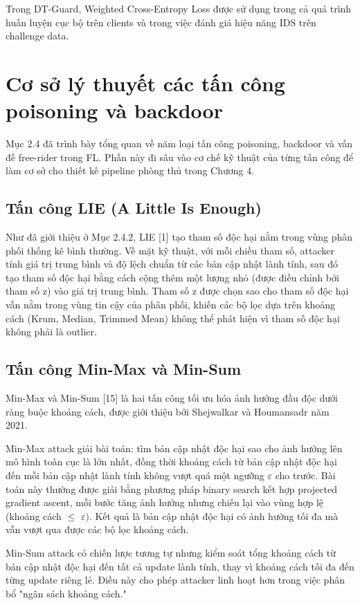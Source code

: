 Trong DT-Guard, Weighted Cross-Entropy Loss được sử dụng trong cả quá trình huấn luyện cục bộ trên clients và trong việc đánh giá hiệu năng IDS trên challenge data.

\section{Cơ sở lý thuyết các tấn công poisoning và backdoor}
Mục 2.4 đã trình bày tổng quan về năm loại tấn công poisoning, backdoor và vấn đề free-rider trong FL. Phần này đi sâu vào cơ chế kỹ thuật của từng tấn công để làm cơ sở cho thiết kế pipeline phòng thủ trong Chương 4.

\subsection{Tấn công LIE (A Little Is Enough)}
Như đã giới thiệu ở Mục 2.4.2, LIE {[}1{]} tạo tham số độc hại nằm trong vùng phân phối thống kê bình thường. Về mặt kỹ thuật, với mỗi chiều tham số, attacker tính giá trị trung bình và độ lệch chuẩn từ các bản cập nhật lành tính, sau đó tạo tham số độc hại bằng cách cộng thêm một lượng nhỏ (được điều chỉnh bởi tham số z) vào giá trị trung bình. Tham số z được chọn sao cho tham số độc hại vẫn nằm trong vùng tin cậy của phân phối, khiến các bộ lọc dựa trên khoảng cách (Krum, Median, Trimmed Mean) không thể phát hiện vì tham số độc hại không phải là outlier.

\subsection{Tấn công Min-Max và Min-Sum}
Min-Max và Min-Sum {[}15{]} là hai tấn công tối ưu hóa ảnh hưởng đầu độc dưới ràng buộc khoảng cách, được giới thiệu bởi Shejwalkar và Houmansadr năm 2021.

Min-Max attack giải bài toán: tìm bản cập nhật độc hại sao cho ảnh hưởng lên mô hình toàn cục là lớn nhất, đồng thời khoảng cách từ bản cập nhật độc hại đến mỗi bản cập nhật lành tính không vượt quá một ngưỡng $\varepsilon$ cho trước. Bài toán này thường được giải bằng phương pháp binary search kết hợp projected gradient ascent, mỗi bước tăng ảnh hưởng nhưng chiếu lại vào vùng hợp lệ (khoảng cách $\leq$ $\varepsilon)$. Kết quả là bản cập nhật độc hại có ảnh hưởng tối đa mà vẫn vượt qua được các bộ lọc khoảng cách.

Min-Sum attack có chiến lược tương tự nhưng kiểm soát tổng khoảng cách từ bản cập nhật độc hại đến tất cả update lành tính, thay vì khoảng cách tối đa đến từng update riêng lẻ. Điều này cho phép attacker linh hoạt hơn trong việc phân bổ "ngân sách khoảng cách."

